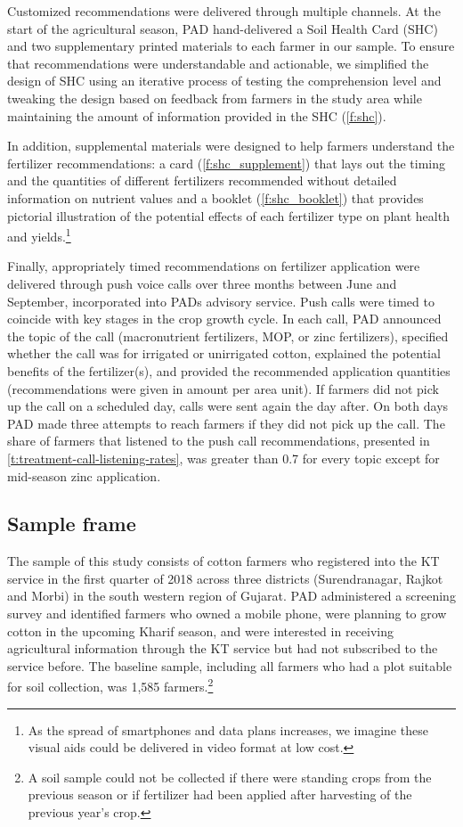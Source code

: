 \documentclass{article}
\begin{document}
Customized recommendations were delivered through multiple channels. At the start of the agricultural season, PAD hand-delivered a Soil  Health Card (SHC) and two supplementary printed materials to each farmer in our sample. To ensure that recommendations were understandable and actionable, we simplified the design of SHC using an iterative process of testing the comprehension level and tweaking the design based on feedback from farmers in the study area while maintaining the amount of information provided in the SHC (\ref{f:shc}).

In addition, supplemental materials were designed to help farmers understand the fertilizer recommendations: a card (\ref{f:shc_supplement}) that lays out the timing and the quantities of different fertilizers recommended without detailed information on nutrient values and a booklet (\ref{f:shc_booklet}) that provides pictorial illustration of the potential effects of each fertilizer type on plant health and yields.\footnote{As the spread of smartphones and data plans increases, we imagine these visual aids could be delivered in video format at low cost.}

Finally, appropriately timed recommendations on fertilizer application were delivered through push voice calls over three months between June and September, incorporated into PADs advisory service. Push calls were timed to coincide with key stages in the crop growth cycle. In each call, PAD announced the topic of the call (macronutrient fertilizers, MOP, or zinc fertilizers), specified whether the call was for irrigated or unirrigated cotton, explained the potential benefits of the fertilizer(s), and provided the recommended application quantities (recommendations were given in amount per area unit). If farmers did not pick up the call on a scheduled day, calls were sent again the day after. On both days PAD made three attempts to reach farmers if they did not pick up the call. The share of farmers that listened to the push call recommendations, presented in \ref{t:treatment-call-listening-rates}, was greater than 0.7 for every topic except for mid-season zinc application. 

\subsection{Sample frame}

The sample of this study consists of cotton farmers who registered into the KT service in the first quarter of 2018 across three districts (Surendranagar, Rajkot and Morbi) in the south western region of Gujarat. PAD administered a screening survey and identified farmers who owned a mobile phone, were planning to grow cotton in the upcoming Kharif season, and were interested in receiving agricultural information through the KT service but had not subscribed to the service before. The baseline sample, including all farmers who had a plot suitable for soil collection, was 1,585 farmers.\footnote{A soil sample could not be collected if there were standing crops from the previous season or if fertilizer had been applied after harvesting of the previous year’s crop.}
\end{document}
